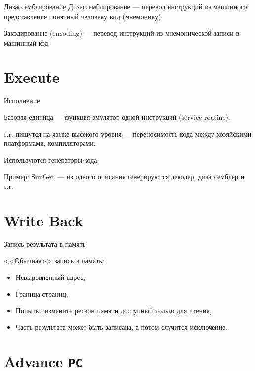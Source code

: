 \begin{frame}{Дизассемблирование}
Дизассемблирование --- перевод инструкций из машинного представление понятный
человеку вид (мнемонику).

\pause\bigskip

Закодирование (encoding) --- перевод инструкций из мнемонической записи в
машинный код.
\end{frame}

\section{Execute}

\begin{frame}{Исполнение}

Базовая единица --- функция-эмулятор одной инструкции (service routine).

\bigskip

s.r. пишутся на языке высокого уровня --- переносимость кода между хозяйскими
платформами, компиляторами.

\bigskip

Используются генераторы кода.

Пример: SimGen --- из одного описания генерируются декодер, дизассемблер и s.r.

\end{frame}

\section{Write Back}

\begin{frame}{Запись результата в память}

<<Обычная>> запись в память:

\pause

\begin{itemize}
    \item Невыровненный адрес,
    \item Граница страниц,
    \item Попытки изменить регион памяти доступный только для чтения,
    \item Часть результата может быть записана, а потом случится исключение.
\end{itemize}

\end{frame}

\section{Advance \texttt{PC}}

